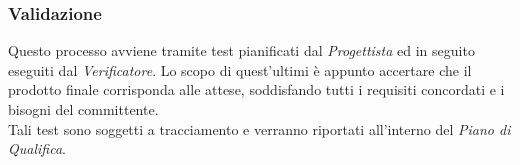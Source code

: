 \subsubsection{Validazione}
Questo processo avviene tramite test pianificati dal \textit{Progettista} ed in seguito eseguiti dal \textit{Verificatore}.
Lo scopo di quest'ultimi è appunto accertare che il prodotto finale corrisponda alle attese, soddisfando tutti i requisiti concordati e i bisogni del committente. \\
Tali test sono soggetti a tracciamento e verranno riportati all'interno del \textit{Piano di Qualifica}.